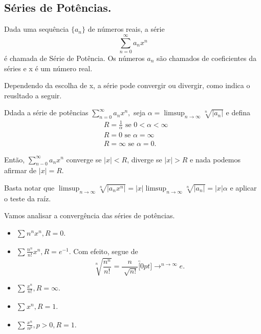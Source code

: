 \documentclass[Analysis/analysis_notes.tex]{subfiles}
\begin{document}
\subsection{S\'eries de Pot\^encias.}
\begin{def*}
	Dada uma sequ\^encia $\{a_{n}\}$ de n\'umeros reais, a s\'erie
	$$
		\sum\limits_{n=0}^{\infty}a_{n}x^{n}
	$$
	\'e chamada de S\'erie de Pot\^encia. Os n\'umeros $a_{n}$ s\~ao chamados de coeficientes da s\'eries e x \'e um n\'umero real.
\end{def*}
Dependendo da escolha de x, a s\'erie pode convergir ou divergir, como indica o reusltado a seguir.
\begin{theorem*}
	Ddada a s\'erie de pot\^encias $\sum\limits_{n=0}^{\infty}a_{n}x^{n},$ seja $\alpha = \limsup_{n\to\infty}\sqrt[n]{|a_{n}|}$ e defina
	\begin{align*}
		 & R = \frac{1}{\alpha}\text{ se } 0 < \alpha < \infty \\
		 & R = 0 \text{ se } \alpha = \infty                   \\
		 & R = \infty \text{ se } \alpha = 0.
	\end{align*}
\end{theorem*}
Ent\~ao, $\sum\limits_{n-0}^{\infty}a_{n}x^{n}$ converge se $|x|<R$, diverge se $|x|>R$ e nada podemos afirmar de $|x|=R.$
\begin{proof*}
	Basta notar que $\limsup_{n\to\infty}\sqrt[n]{|a_{n}x^{n}|} = |x|\limsup_{n\to\infty}\sqrt[n]{|a_{n}|} = |x|\alpha$ e aplicar
	o teste da ra\'iz. \qedsymbol
\end{proof*}
Vamos analisar a converg\^encia das s\'eries de pot\^encias.
\begin{example}
	\begin{itemize}
		\item $\sum\limits_{}^{}n^{n}x^{n}, R = 0. $
		\item $\sum\limits_{}^{}\frac{n^{n}}{n!}x^{n}, R = e^{-1}.$ Com efeito, segue de
		      $$
			      \sqrt[n]{\frac{n^{n}}{n!}} = \frac{n}{\sqrt[]{n!}}\overbracket[0pt]{\longrightarrow}^{n\to \infty}e.
		      $$
		\item $\sum\limits_{}^{}\frac{x^{n}}{n!}, R = \infty.$
		\item $\sum\limits_{}^{}x^{n}, R=1.$
		\item $\sum\limits_{}^{}\frac{x^{n}}{n^{p}}, p > 0, R = 1.$
	\end{itemize}
\end{example}
\end{document}

